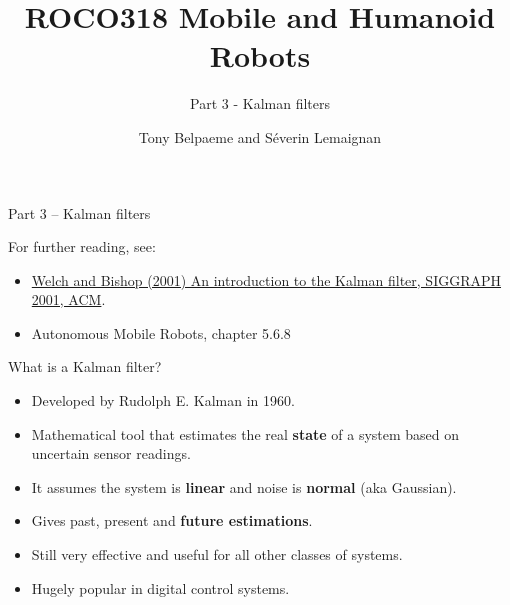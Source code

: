 \documentclass[compress]{beamer}
\title{ROCO318 \newline Mobile and Humanoid Robots}
\subtitle{Part 3 - Kalman filters}
\date{}
\author{Tony Belpaeme and Séverin Lemaignan}
\institute{Centre for Neural Systems and Robotics\\{\bf Plymouth University}}
\begin{document}

\maketitle

\begin{frame}{Part 3 -- Kalman filters}

    For further reading, see:
    \begin{itemize}
        \item \href{http://www.cs.unc.edu/~welch/kalman/}{Welch and Bishop
            (2001) An introduction to the Kalman filter, SIGGRAPH 2001, ACM}.
        \item Autonomous Mobile Robots, chapter 5.6.8
    \end{itemize}
    


\end{frame}

\begin{frame}{What is a Kalman filter?}

    \begin{itemize}
        \item Developed by Rudolph E. Kalman in 1960.
        \item Mathematical tool that estimates the real
            \textbf{state} of a system based on uncertain
            sensor readings.
        \item It assumes the system is \textbf{linear} and noise is
            \textbf{normal} (aka Gaussian).
        \item Gives past, present and \textbf{future estimations}.
        \item Still very effective and useful for all other classes of systems.
        \item Hugely popular in digital control systems.
    \end{itemize}


\end{frame}
\end{document}
